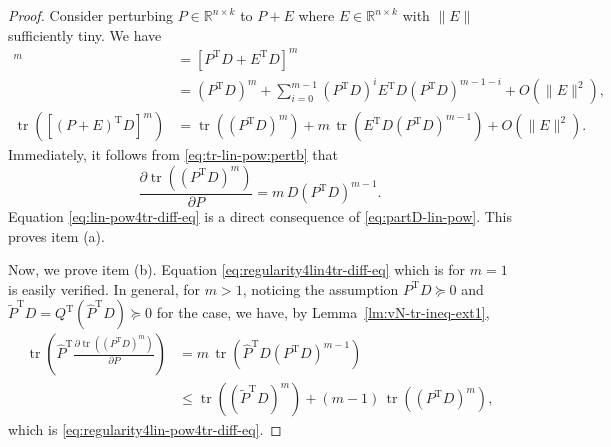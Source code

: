 \documentclass[11pt]{article}
\def\bbR{\mathbb{R}}
\def\wtd{\widetilde}
\def\what{\widehat}
\DeclareMathOperator{\tr}{tr}
\DeclareMathOperator{\T}{T}
\theoremstyle{definition}
\numberwithin{equation}{section}
\begin{document}
\begin{proof}
Consider perturbing $P\in\bbR^{n\times k}$ to $P+E$ where $E\in\bbR^{n\times k}$ with
$\|E\|$  sufficiently tiny. We have
\begin{align}
[(P+E)^{\T}D]^m&=[P^{\T}D+E^{\T}D]^m \nonumber\\
  &=(P^{\T}D)^m+\sum_{i=0}^{m-1}(P^{\T}D)^iE^{\T}D(P^{\T}D)^{m-1-i}+O(\|E\|^2), \label{eq:lin-pow:pertb}\\
\tr([(P+E)^{\T}D]^m)
  &=\tr((P^{\T}D)^m)+m\,\tr(E^{\T}D(P^{\T}D)^{m-1})+O(\|E\|^2). \label{eq:tr-lin-pow:pertb}
\end{align}
Immediately, it follows from \eqref{eq:tr-lin-pow:pertb} that
\begin{equation} \label{eq:partD-lin-pow}
\frac{\partial \tr((P^{\T}D)^m)}{\partial P}=m\,D(P^{\T}D)^{m-1}.
\end{equation}
Equation \eqref{eq:lin-pow4tr-diff-eq} is a direct consequence
of \eqref{eq:partD-lin-pow}. This proves item (a).

Now, we prove item (b). %
Equation \eqref{eq:regularity4lin4tr-diff-eq}  which is for $m=1$ is easily verified.
In general, for $m>1$,
noticing the assumption $P^{\T}D\succeq 0$ and $\wtd P^{\T}D=Q^{\T}(\what P^{\T}D)\succeq 0$ for the case,
we have, by Lemma~\ref{lm:vN-tr-ineq-ext1},
\begin{align}
\tr\left(\what P^{\T}\frac{\partial \tr((P^{\T}D)^m)}{\partial P}\right)
  &=m\,\tr(\what P^{\T}D(P^{\T}D)^{m-1}) \nonumber\\
  &\le\tr((\wtd P^{\T}D)^m)+(m-1)\,\tr((P^{\T}D)^m),
  \label{eq:lin4tr-diff-eq:pf-1}
\end{align}
which is \eqref{eq:regularity4lin-pow4tr-diff-eq}.
\end{proof}
\end{document}
